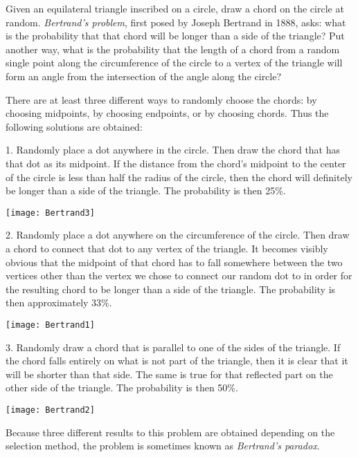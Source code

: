 \documentclass[12pt]{article}
\begin{document}
Given an equilateral triangle inscribed on a circle, draw a chord on the circle at random. \emph{Bertrand's problem}, first posed by Joseph Bertrand in 1888, asks: what is the probability that that chord will be longer than a side of the triangle? Put another way, what is the probability that the length of a chord from a random single point along the circumference of the circle to a vertex of the triangle will form an angle from the intersection of the angle along the circle?

There are at least three different ways to randomly choose the chords: by choosing midpoints, by choosing endpoints, or by choosing chords. Thus the following solutions are obtained:

1. Randomly place a dot anywhere in the circle. Then draw the chord that has that dot as its midpoint. If the distance from the chord's midpoint to the center of the circle is less than half the radius of the circle, then the chord will definitely be longer than a side of the triangle. The probability is then 25\%.

\begin{center}
\texttt{[image: Bertrand3]}
\end{center}

2. Randomly place a dot anywhere on the circumference of the circle. Then draw a chord to connect that dot to any vertex of the triangle. It becomes visibly obvious that the midpoint of that chord has to fall somewhere between the two vertices other than the vertex we chose to connect our random dot to in order for the resulting chord to be longer than a side of the triangle. The probability is then approximately 33\%.

\begin{center}
\texttt{[image: Bertrand1]}
\end{center}

3. Randomly draw a chord that is parallel to one of the sides of the triangle. If the chord falls entirely on what is not part of the triangle, then it is clear that it will be shorter than that side. The same is true for that reflected part on the other side of the triangle. The probability is then 50\%.

\begin{center}
\texttt{[image: Bertrand2]}
\end{center}


Because three different results to this problem are obtained depending on the selection method, the problem is sometimes known as \emph{Bertrand's paradox}.
\end{document}
